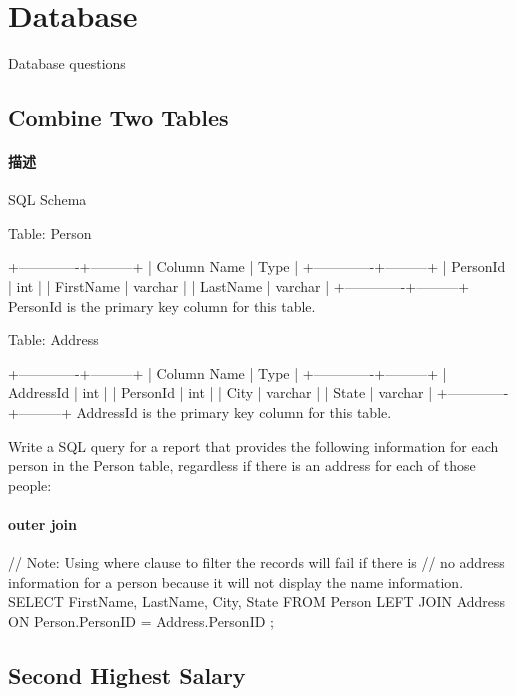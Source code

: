 \chapter{Database}
Database questions
\newline

\section{Combine Two Tables} %
\label{sec:combine-two-tables}


\subsubsection{描述}
SQL Schema

Table: Person
\begin{Code}
+-------------+---------+
| Column Name | Type    |
+-------------+---------+
| PersonId    | int     |
| FirstName   | varchar |
| LastName    | varchar |
+-------------+---------+
PersonId is the primary key column for this table.
\end{Code}

Table: Address
\begin{Code}
+-------------+---------+
| Column Name | Type    |
+-------------+---------+
| AddressId   | int     |
| PersonId    | int     |
| City        | varchar |
| State       | varchar |
+-------------+---------+
AddressId is the primary key column for this table.
\end{Code}

Write a SQL query for a report that provides the following information for each person in the Person table, regardless if there is an address for each of those people:

\subsubsection{outer join}
\begin{Code}
  // Note: Using where clause to filter the records will fail if there is
  // no address information for a person because it will not display the name information.
SELECT
    FirstName, LastName, City, State
FROM
    Person LEFT JOIN Address
ON
    Person.PersonID = Address.PersonID
;
\end{Code}

\section{Second Highest Salary} %
\label{sec:second-highest-salary}


